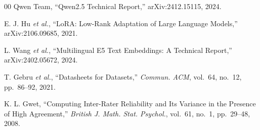 \documentclass[conference,a4paper]{IEEEtran}
\begin{document}
\begin{thebibliography}{00}
Qwen Team, ``Qwen2.5 Technical Report,'' arXiv:2412.15115, 2024.

E. J. Hu \emph{et al.}, ``LoRA: Low-Rank Adaptation of Large Language Models,''
arXiv:2106.09685, 2021.

L. Wang \emph{et al.}, ``Multilingual E5 Text Embeddings: A Technical Report,''
arXiv:2402.05672, 2024.

T. Gebru \emph{et al.}, ``Datasheets for Datasets,'' \emph{Commun. ACM},
vol.~64, no.~12, pp.~86--92, 2021.

K. L. Gwet, ``Computing Inter-Rater Reliability and Its Variance in the
Presence of High Agreement,'' \emph{British J. Math. Stat. Psychol.},
vol.~61, no.~1, pp.~29--48, 2008.

\end{thebibliography}
\end{document}
